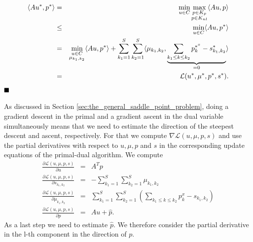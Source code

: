 \documentclass[abstracton]{scrreprt}
\newcommand{\qed}{$\hfill\blacksquare$}
\newenvironment{proof}[1][Proof]{\begin{trivlist}
\item[\hskip \labelsep {\bfseries #1}]}{\end{trivlist}}
\begin{document}
\begin{proof}
                    \begin{eqnarray}
                        \langle Au^{\ast}, p^{\ast} \rangle &=& \min_{u \in C} \max_{\substack{p \in K_{p} \\ p \in K_{nl}}} \langle Au, p \rangle \notag \\
                        &\le& \min_{u \in C} \langle Au, p^{\ast} \rangle \notag \\
                        &=& \min_{\substack{u \in C \\ \mu_{k_{1}, k_{2}}}} \langle Au, p^{\ast} \rangle + \sum_{k_{1} = 1}^{S} \sum_{k_{2} = 1}^{S} \langle \mu_{k_{1}, k_{2}}, \underbrace{\sum_{k_{1} \le k \le k_{2}} p^{\ast^{x}}_{k} - s^{\ast}_{k_{1}, k_{2}}}_{= 0} \rangle \notag \\
                        &=& \mathcal{L}(u^{\ast}, \mu^{\ast}, p^{\ast}, s^{\ast}). \notag
                    \end{eqnarray}\qed 
            \end{proof}
        As discussed in Section \ref{sec:the_general_saddle_point_problem}, doing a gradient descent in the primal and a gradient ascent in the dual variable simultaneously means that we need to estimate the direction of the steepest descent and ascent, respectively. For that we compute $\nabla \mathcal{L}(u, \mu, p, s)$ and use the partial derivatives with respect to $u, \mu, p$ and $s$ in the corresponding update equations of the primal-dual algorithm. We compute
            \begin{eqnarray}
                \frac{\partial \mathcal{L}(u, \mu, p, s)}{\partial u} &=& A^{T} p \\
                \frac{\partial \mathcal{L}(u, \mu, p, s)}{\partial s_{k_{1}, k_{2}}} &=& -\sum_{k_{1} = 1}^{S} \sum_{k_{2} = 1}^{S} \mu_{k_{1}, k_{2}} \\
                \frac{\partial \mathcal{L}(u, \mu, p, s)}{\partial \mu_{k_{1}, k_{2}}} &=& \sum_{k_{1} = 1}^{S} \sum_{k_{2} = 1}^{S} \left( \sum_{k_{1} \le k \le k_{2}} p^{x}_{k} - s_{k_{1}, k_{2}} \right) \\
                \frac{\partial \mathcal{L}(u, \mu, p, s)}{\partial p} &=& Au + \hat{p}.
            \end{eqnarray}
        As a last step we need to estimate $\hat{p}$. We therefore consider the partial derivative in the l-th component in the direction of $p$.
\end{document}
